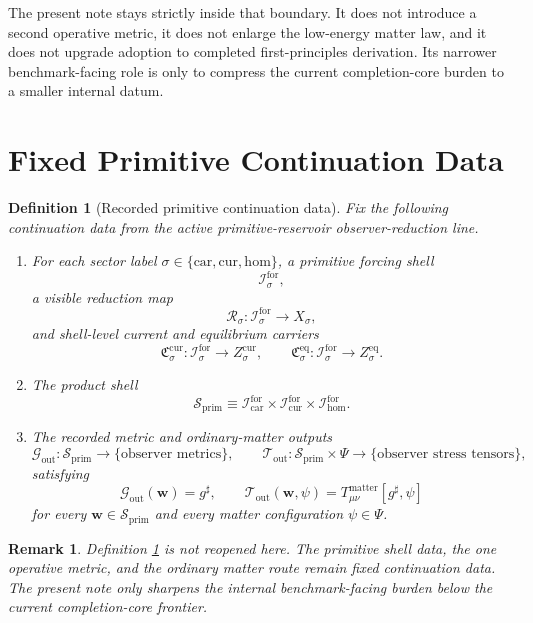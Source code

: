 \documentclass[11pt]{article}
\newcommand{\CompletedMetric}{g^{\sharp}}
\newcommand{\Car}{\mathrm{car}}
\newcommand{\Cur}{\mathrm{cur}}
\newcommand{\Hom}{\mathrm{hom}}
\newcommand{\ForSpace}[1]{\mathcal I_{#1}^{\mathrm{for}}}
\newcommand{\PrimShell}{\mathcal S_{\mathrm{prim}}}
\newcommand{\Reduction}[1]{\mathcal R_{#1}}
\newcommand{\CurrentCarrier}[1]{\mathfrak C_{#1}^{\mathrm{cur}}}
\newcommand{\EqCarrier}[1]{\mathfrak C_{#1}^{\mathrm{eq}}}
\newcommand{\MetricOut}{\mathscr G_{\mathrm{out}}}
\newcommand{\MatterOut}{\mathscr T_{\mathrm{out}}}
\newtheorem{definition}{Definition}
\newtheorem{remark}{Remark}
\begin{document}
The present note stays strictly inside that boundary. It does not introduce a second operative metric, it does not enlarge the low-energy matter law, and it does not upgrade adoption to completed first-principles derivation. Its narrower benchmark-facing role is only to compress the current completion-core burden to a smaller internal datum.

\section{Fixed Primitive Continuation Data}

\begin{definition}[Recorded primitive continuation data]
\label{def:fixed}
Fix the following continuation data from the active primitive-reservoir observer-reduction line.
\begin{enumerate}
    \item For each sector label \(\sigma\in\{\Car,\Cur,\Hom\}\), a primitive forcing shell
    \[
    \ForSpace{\sigma},
    \]
    a visible reduction map
    \[
    \Reduction{\sigma}:\ForSpace{\sigma}\to X_{\sigma},
    \]
    and shell-level current and equilibrium carriers
    \[
    \CurrentCarrier{\sigma}:\ForSpace{\sigma}\to Z_{\sigma}^{\mathrm{cur}},
    \qquad
    \EqCarrier{\sigma}:\ForSpace{\sigma}\to Z_{\sigma}^{\mathrm{eq}}.
    \]
    \item The product shell
    \[
    \PrimShell
    \equiv
    \ForSpace{\Car}\times \ForSpace{\Cur}\times \ForSpace{\Hom}.
    \]
    \item The recorded metric and ordinary-matter outputs
    \[
    \MetricOut:\PrimShell\to\{\text{observer metrics}\},
    \qquad
    \MatterOut:\PrimShell\times\Psi\to\{\text{observer stress tensors}\},
    \]
    satisfying
    \begin{equation}
    \MetricOut(\mathbf w)=\CompletedMetric,
    \qquad
    \MatterOut(\mathbf w,\psi)
    =
    T_{\mu\nu}^{\mathrm{matter}}[\CompletedMetric,\psi]
    \label{eq:fixedoutputs}
    \end{equation}
    for every \(\mathbf w\in\PrimShell\) and every matter configuration \(\psi\in\Psi\).
\end{enumerate}
\end{definition}

\begin{remark}
Definition \ref{def:fixed} is not reopened here. The primitive shell data, the one operative metric, and the ordinary matter route remain fixed continuation data. The present note only sharpens the internal benchmark-facing burden below the current completion-core frontier.
\end{remark}
\end{document}
